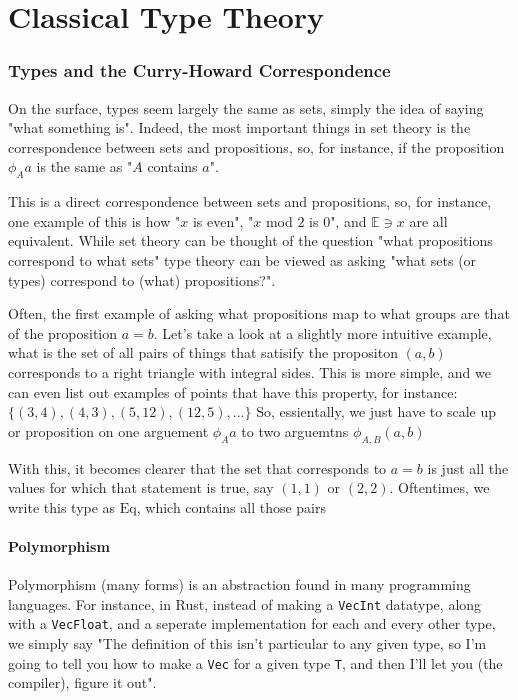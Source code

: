 \part{Classical Type Theory}
\section{Types and the Curry-Howard Correspondence}
On the surface, types seem largely the same as sets, simply the idea of saying "what something is". 
Indeed, the most important things in set theory is the correspondence between sets and propositions, so, for instance, if the proposition $\phi_A a$ is the same as "$A$ contains $a$".

This is a direct correspondence between sets and propositions, so, for instance, one example of this is how "$x$ is even", "$x$ mod $2$ is $0$", and $\mathbb{E} \ni x$ are all equivalent. While set theory can be thought of the question "what propositions correspond to what sets" type theory can be viewed as asking "what sets (or types) correspond to (what) propositions?".

Often, the first example of asking what propositions map to what groups are that of the proposition $a=b$.
Let's take a look at a slightly more intuitive example, what is the set of all pairs of things that satisify the propositon  $(a,b)$ corresponds to a right triangle with integral sides.
This is more simple, and we can even list out examples of points that have this property, for instance:
\begin{math}
	\{(3,4),(4,3),(5,12),(12,5),...\}
\end{math}
So, essientally, we just have to scale up or proposition on one arguement $\phi_A a$ to two arguemtns $\phi_{A,B} (a,b)$

With this, it becomes clearer that the set that corresponds to $a = b$ is just all the values for which that statement is true, say $(1,1)$ or $(2,2)$. Oftentimes, we write this type as $\textrm{Eq}$, which contains all those pairs 

\subsection{Polymorphism}
Polymorphism (many forms) is an abstraction found in many programming languages. For instance, in Rust, instead of making a \verb|VecInt| datatype, along with a \verb|VecFloat|, and a seperate implementation for each and every other type, we simply say "The definition of this isn't particular to any given type, so I'm going to tell you how to make a \verb|Vec| for a given type \verb|T|, and then I'll let you (the compiler), figure it out".

